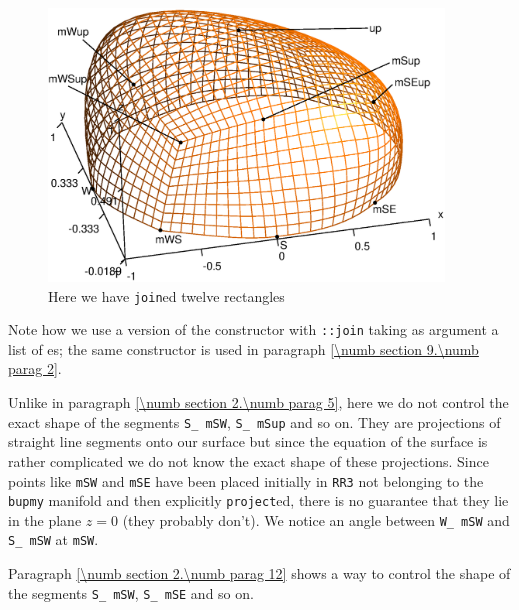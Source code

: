\begin{figure} \centering
  \includegraphics[width=105mm]{hemisphere-2}
  \caption{Here we have {\small\tt join}ed twelve rectangles}
  \label{\numb section 2.\numb fig 6}
\end{figure}

Note how we use a version of the {\small\tt {}} constructor with {\small\tt {}::join}
taking as argument a list of {\small\tt {}}es; the same constructor is used in
paragraph \ref{\numb section 9.\numb parag 2}.

Unlike in paragraph \ref{\numb section 2.\numb parag 5}, here we do not control the
exact shape of the segments {\small\tt S\_\,mSW}, {\small\tt S\_\,mSup} and so on.
They are projections of straight line segments onto our surface but since the equation
of the surface is rather complicated we do not know the exact shape of these projections.
Since points like {\small\tt mSW} and {\small\tt mSE} have been placed initially in
{\small\tt RR3} not belonging to the {\small\tt bupmy} manifold and then explicitly
{\small\tt project}ed,
there is no guarantee that they lie in the plane $ z = 0 $ (they probably don't).
We notice an angle between {\small\tt W\_\,mSW} and {\small\tt S\_\,mSW} at {\small\tt mSW}.

Paragraph \ref{\numb section 2.\numb parag 12} shows a way to control the shape of the segments
{\small\tt S\_\,mSW}, {\small\tt S\_\,mSE} and so on.

